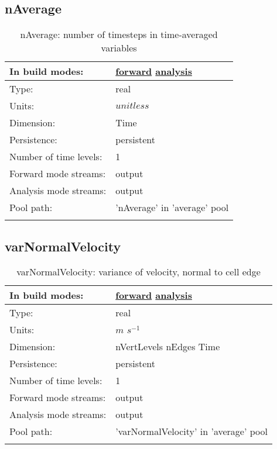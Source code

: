 \subsection[nAverage]{nAverage}
\label{subsec:var_sec_average_nAverage}
\begin{center}
\begin{longtable}{| p{2.0in} | p{4.0in} |}
        \hline 
        In build modes: & \hyperref[subsec:forward_var_tab_average]{forward} \hyperref[subsec:analysis_var_tab_average]{analysis} \\
        \hline 
        Type: & real \\
        \hline 
        Units: & $unitless$ \\
        \hline 
        Dimension: & Time \\
        \hline 
        Persistence: & persistent \\
        \hline 
        Number of time levels: & 1 \\
        \hline 
		 Forward mode streams: &  output \\
        \hline 
		 Analysis mode streams: &  output \\
        \hline 
            Pool path: & 'nAverage' in 'average' pool
 \\
		 \hline 
    \caption{nAverage: number of timesteps in time-averaged variables}
\end{longtable}
\end{center}
\subsection[varNormalVelocity]{varNormalVelocity}
\label{subsec:var_sec_average_varNormalVelocity}
\begin{center}
\begin{longtable}{| p{2.0in} | p{4.0in} |}
        \hline 
        In build modes: & \hyperref[subsec:forward_var_tab_average]{forward} \hyperref[subsec:analysis_var_tab_average]{analysis} \\
        \hline 
        Type: & real \\
        \hline 
        Units: & $m$ $s^{-1}$ \\
        \hline 
        Dimension: & nVertLevels nEdges Time \\
        \hline 
        Persistence: & persistent \\
        \hline 
        Number of time levels: & 1 \\
        \hline 
		 Forward mode streams: &  output \\
        \hline 
		 Analysis mode streams: &  output \\
        \hline 
            Pool path: & 'varNormalVelocity' in 'average' pool
 \\
		 \hline 
    \caption{varNormalVelocity: variance of velocity, normal to cell edge}
\end{longtable}
\end{center}
